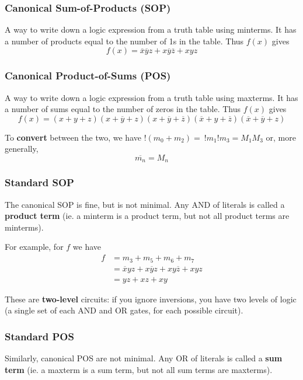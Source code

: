 \documentclass[12pt]{article}
\begin{document}
\subsubsection*{Canonical Sum-of-Products (SOP)}
A way to write down a logic expression from a truth table using minterms. It has a number of products equal to the number of 1s in the table. Thus $f(x)$  gives \[ f(x) = \overline{x}\overline{y}z + x\overline{y}\overline{z} + xyz \]

\subsubsection*{Canonical Product-of-Sums (POS)}
A way to write down a logic expression from a truth table using maxterms. It has a number of sums equal to the number of zeros in the table. Thus $f(x)$ gives \[ f(x) = (x + y + z)(x + \overline{y} + z)(x + \overline{y} + \overline{z})(\overline{x} + y + \overline{z})(\overline{x} + \overline{y} + z) \]

To {\bf convert} between the two, we have $!(m_0 + m_2) = \ !m_1!m_3 = M_1M_3$ or, more generally, \[ \overline{m_n} = M_n \]

\subsubsection*{Standard SOP}
The canonical SOP is fine, but is not minimal. Any AND of literals is called a {\bf product term} (ie. a minterm is a product term, but not all product terms are minterms).

For example, for $f$ we have
\begin{align*}
f &= m_3 + m_5 + m_6 + m_7\\
  &= \overline{x}yz + x\overline{y}z + xy\overline{z} + xyz\\
  &= yz + xz + xy
\end{align*}

These are {\bf two-level} circuits: if you ignore inversions, you have two levels of logic (a single set of each AND and OR gates, for each possible circuit).

\subsubsection*{Standard POS}
Similarly, canonical POS are not minimal. Any OR of literals is called a {\bf sum term} (ie. a maxterm is a sum term, but not all sum terms are maxterms).
\end{document}
